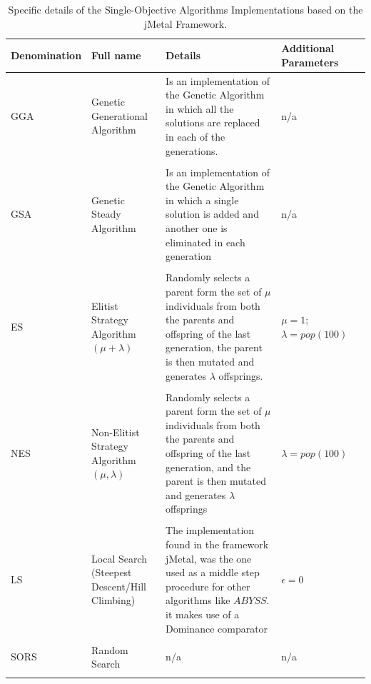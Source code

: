 \par
\begin{table}[H]
    \begin{tabular}{p{}p{}p{}p{}p{}}
    \hline
    Denomination  & Full name & Details & Additional Parameters
    \\
    \hline
    GGA & Genetic Generational Algorithm & Is an implementation of the Genetic Algorithm in which all the solutions are replaced in each of the generations. & n/a \\ \\
    GSA & Genetic Steady Algorithm & Is an implementation of the Genetic Algorithm in which a single solution is added and another one is eliminated in each generation & n/a \\ \\
    ES & Elitist Strategy Algorithm $(\mu + \lambda)$ & Randomly selects a parent form the set of $\mu$ individuals from both the parents and offspring of the last generation, the parent is then mutated and generates $\lambda$ offsprings. & $\mu = 1$; $\lambda = pop (100)$ \\ \\
    NES & Non-Elitist Strategy Algorithm $(\mu,\lambda)$ & Randomly selects a parent form the set of $\mu$ individuals from both the parents and offspring of the last generation, and the parent is then mutated and generates $\lambda$ offsprings  & $\lambda = pop (100)$ \\ \\
    LS & Local Search (Steepest Descent/Hill Climbing) & The implementation found in the framework jMetal, was the one used as a middle step procedure for other algorithms like $ABYSS$. it makes use of a Dominance comparator & $\epsilon = 0$ \\ \\
    SORS & Random Search & n/a & n/a  \\ \\
    \hline
    \end{tabular}
    \caption{Specific details of the Single-Objective Algorithms Implementations based on the jMetal Framework.}
    \label{table:(SOA)_details_jmetal}
\end{table}

